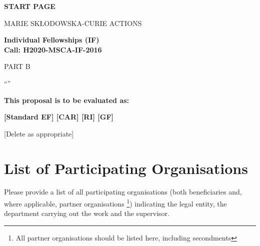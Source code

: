 
\phantom{a}
\vspace{15mm}
\begin{center}


        \Large{
      
     
        \textbf{START PAGE}
  
          \vspace{15mm}
          MARIE SK\L{}ODOWSKA-CURIE ACTIONS\\
          \vspace{1cm}
          
          \textbf{Individual Fellowships (IF)}\\
          \textbf{Call: H2020-MSCA-IF-2016}
          \vspace{2cm}                   

          PART B
          \vspace{2.5cm}

          ``\acronym''
          \vspace{2cm}

          \textbf{This proposal is to be evaluated as:}
          \vspace{.5cm}

          \textbf{[Standard EF] [CAR] [RI] [GF]}\\
        }
        \large{[Delete as appropriate]}

  \end{center}
\vspace{1cm}

\newpage
{}
\setcounter{tocdepth}{1}
\tableofcontents
{}


\newpage
{}
\section*{List of Participating Organisations}
\label{sec:participants}

Please provide a list of all participating organisations (both beneficiaries and, where applicable, partner organisations%
\footnote{All partner organisations should be listed here, including secondments}) 
indicating the legal entity, the department carrying out the work and the supervisor.

